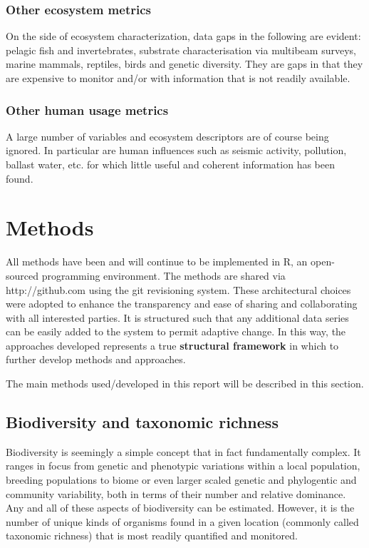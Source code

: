 \documentclass[letterpaper,portrait,11pt]{scrartcl}
\numberwithin{equation}{section}		%
\numberwithin{figure}{section}		%
\numberwithin{table}{section}				%
\begin{document}
\subsubsection{Other ecosystem metrics}
On the side of ecosystem characterization, data gaps in the following are evident: pelagic fish and invertebrates, substrate characterisation via multibeam surveys, marine mammals, reptiles, birds and genetic diversity. They are gaps in that they are expensive to monitor and/or with information that is not readily available. 

\subsubsection{Other human usage metrics}
A large number of variables and ecosystem descriptors are of course being ignored. In particular are human influences such as seismic activity, pollution, ballast water, etc. for which little useful and coherent information has been found. 



\section{Methods}

All methods have been and will continue to be implemented in R, an open-sourced programming environment. The methods are shared via http://github.com using the git revisioning system. These architectural choices were adopted to enhance the transparency and ease of sharing and collaborating with all interested parties. It is structured such that any additional data series can be easily added to the system to permit adaptive change. In this way, the approaches developed represents a true \textbf{structural framework} in which to further develop methods and approaches. 

The main methods used/developed in this report will be described in this section.


\subsection{Biodiversity and taxonomic richness}


Biodiversity is seemingly a simple concept that in fact fundamentally complex. It ranges in focus from genetic and phenotypic variations within a local population, breeding populations to biome or even larger scaled genetic and phylogentic and community variability, both in terms of their number and relative dominance. Any and all of these aspects of biodiversity can be estimated. However, it is the number of unique kinds of organisms found in a given location (commonly called taxonomic richness) that is most readily quantified and monitored. 
\end{document}
